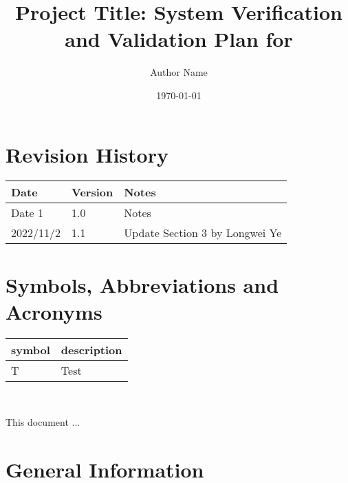 \documentclass[12pt, titlepage]{article}
\begin{document}
\title{Project Title: System Verification and Validation Plan for \progname{}} 
\author{Author Name}
\date{\today}
	
\maketitle


\section{Revision History}

\begin{tabularx}{\textwidth}{p{3cm}p{2cm}X}
\toprule {\bf Date} & {\bf Version} & {\bf Notes}\\
\midrule
Date 1 & 1.0 & Notes\\
2022/11/2 & 1.1 & Update Section 3 by Longwei Ye\\
\bottomrule
\end{tabularx}

\newpage

\tableofcontents

\listoftables
{}

\listoffigures
{}

\newpage

\section{Symbols, Abbreviations and Acronyms}

\renewcommand{\arraystretch}{1.2}
\begin{tabular}{l l} 
  \toprule		
  \textbf{symbol} & \textbf{description}\\
  \midrule 
  T & Test\\
  \bottomrule
\end{tabular}\\


\newpage


This document ... 

\section{General Information}
\end{document}
